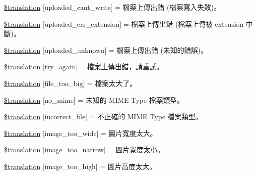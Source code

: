 \begin{DoxyCompactItemize}
\item 
\hyperlink{class_8upload_8zh___t_w_8php_af368fee3b41bc05e6b208c1557a00c00}{\$translation} \mbox{[}\textquotesingle{}uploaded\+\_\+cant\+\_\+write\textquotesingle{}\mbox{]} = \textquotesingle{}檔案上傳出錯 (檔案寫入失敗)。\textquotesingle{}
\item 
\hyperlink{class_8upload_8zh___t_w_8php_a01c69a4c8556602b3892dce727bace11}{\$translation} \mbox{[}\textquotesingle{}uploaded\+\_\+err\+\_\+extension\textquotesingle{}\mbox{]} = \textquotesingle{}檔案上傳出錯 (檔案上傳被 extension 中斷)。\textquotesingle{}
\item 
\hyperlink{class_8upload_8zh___t_w_8php_a4a9168e922b827e6a28b5db1c00774ca}{\$translation} \mbox{[}\textquotesingle{}uploaded\+\_\+unknown\textquotesingle{}\mbox{]} = \textquotesingle{}檔案上傳出錯 (未知的錯誤)。\textquotesingle{}
\item 
\hyperlink{class_8upload_8zh___t_w_8php_a3afc377bd803683314f413a814243066}{\$translation} \mbox{[}\textquotesingle{}try\+\_\+again\textquotesingle{}\mbox{]} = \textquotesingle{}檔案上傳出錯，請重試。\textquotesingle{}
\item 
\hyperlink{class_8upload_8zh___t_w_8php_a476278eb4a0c3df56af068e2d511a741}{\$translation} \mbox{[}\textquotesingle{}file\+\_\+too\+\_\+big\textquotesingle{}\mbox{]} = \textquotesingle{}檔案太大了。\textquotesingle{}
\item 
\hyperlink{class_8upload_8zh___t_w_8php_a191a55df8e3bb7f3c51b70f3c1932e02}{\$translation} \mbox{[}\textquotesingle{}no\+\_\+mime\textquotesingle{}\mbox{]} = \textquotesingle{}未知的 M\+I\+M\+E Type 檔案類型。\textquotesingle{}
\item 
\hyperlink{class_8upload_8zh___t_w_8php_a4d32343e2699edd6fd435f9c832cb9c7}{\$translation} \mbox{[}\textquotesingle{}incorrect\+\_\+file\textquotesingle{}\mbox{]} = \textquotesingle{}不正確的 M\+I\+M\+E Type 檔案類型。\textquotesingle{}
\item 
\hyperlink{class_8upload_8zh___t_w_8php_a0dd3e4930ca1f59ae280f4b1006525cd}{\$translation} \mbox{[}\textquotesingle{}image\+\_\+too\+\_\+wide\textquotesingle{}\mbox{]} = \textquotesingle{}圖片寬度太大。\textquotesingle{}
\item 
\hyperlink{class_8upload_8zh___t_w_8php_a5c9a4cd67fd21c32e0a3b434591a6037}{\$translation} \mbox{[}\textquotesingle{}image\+\_\+too\+\_\+narrow\textquotesingle{}\mbox{]} = \textquotesingle{}圖片寬度太小。\textquotesingle{}
\item 
\hyperlink{class_8upload_8zh___t_w_8php_aa27bde361343f3b63c7cd441860024f8}{\$translation} \mbox{[}\textquotesingle{}image\+\_\+too\+\_\+high\textquotesingle{}\mbox{]} = \textquotesingle{}圖片高度太大。\textquotesingle{}

\end{DoxyCompactItemize}
